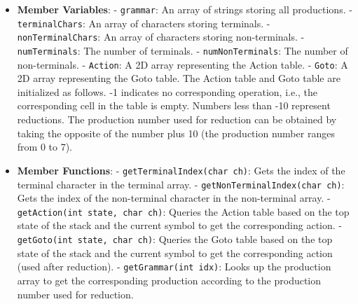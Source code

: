 \documentclass[a4paper,12pt]{article}
\begin{document}
\begin{itemize}
    \item \textbf{Member Variables}:
        - \texttt{grammar}: An array of strings storing all productions.
        - \texttt{terminalChars}: An array of characters storing terminals.
        - \texttt{nonTerminalChars}: An array of characters storing non-terminals.
        - \texttt{numTerminals}: The number of terminals.
        - \texttt{numNonTerminals}: The number of non-terminals.
        - \texttt{Action}: A 2D array representing the Action table.
        - \texttt{Goto}: A 2D array representing the Goto table.
    The Action table and Goto table are initialized as follows. -1 indicates no corresponding operation, i.e., the corresponding cell in the table is empty. Numbers less than -10 represent reductions. The production number used for reduction can be obtained by taking the opposite of the number plus 10 (the production number ranges from 0 to 7).
    \item \textbf{Member Functions}:
        - \texttt{getTerminalIndex(char ch)}: Gets the index of the terminal character in the terminal array.
        - \texttt{getNonTerminalIndex(char ch)}: Gets the index of the non-terminal character in the non-terminal array.
        - \texttt{getAction(int state, char ch)}: Queries the Action table based on the top state of the stack and the current symbol to get the corresponding action.
        - \texttt{getGoto(int state, char ch)}: Queries the Goto table based on the top state of the stack and the current symbol to get the corresponding action (used after reduction).
        - \texttt{getGrammar(int idx)}: Looks up the production array to get the corresponding production according to the production number used for reduction.
\end{itemize}
\end{document}
